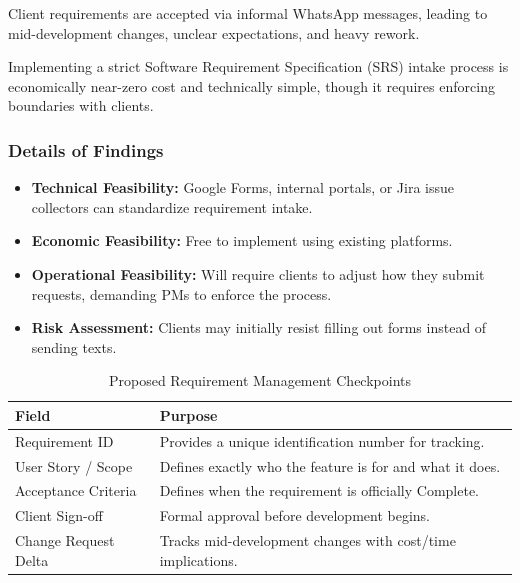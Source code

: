\documentclass[12pt,a4paper]{report}
\begin{document}
\begin{problemBox}
Client requirements are accepted via informal WhatsApp messages, leading to mid-development changes, unclear expectations, and heavy rework.
\end{problemBox}

\begin{summaryBox}
Implementing a strict Software Requirement Specification (SRS) intake process is economically near-zero cost and technically simple, though it requires enforcing boundaries with clients.
\end{summaryBox}

\subsubsection{Details of Findings}

\begin{itemize}[leftmargin=*]
    \item \textbf{Technical Feasibility:} Google Forms, internal portals, or Jira issue collectors can standardize requirement intake.
    \item \textbf{Economic Feasibility:} Free to implement using existing platforms.
    \item \textbf{Operational Feasibility:} Will require clients to adjust how they submit requests, demanding PMs to enforce the process.
    \item \textbf{Risk Assessment:} Clients may initially resist filling out forms instead of sending texts.
\end{itemize}

\begin{table}[H]
\centering
\renewcommand{\arraystretch}{1.3}
\begin{tabularx}{\textwidth}{|p{4cm}|X|}
\hline
\rowcolor{secondary}
\textbf{Field} & \textbf{Purpose} \\
\hline
Requirement ID & Provides a unique identification number for tracking. \\
\hline
User Story / Scope & Defines exactly who the feature is for and what it does. \\
\hline
Acceptance Criteria & Defines when the requirement is officially Complete. \\
\hline
Client Sign-off & Formal approval before development begins. \\
\hline
Change Request Delta & Tracks mid-development changes with cost/time implications. \\
\hline
\end{tabularx}
\caption{Proposed Requirement Management Checkpoints}
\end{table}
\end{document}
